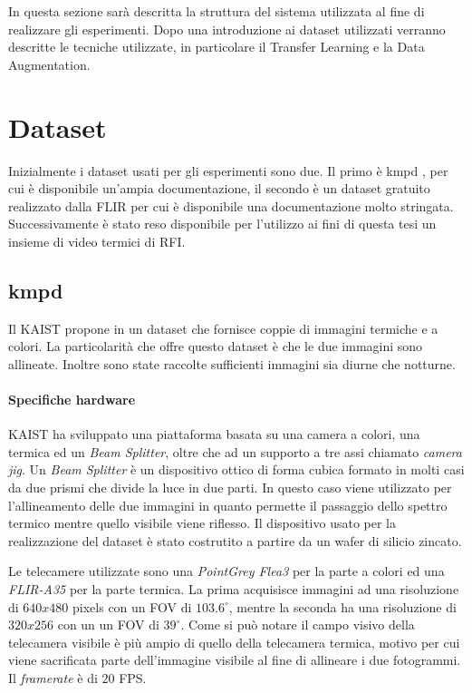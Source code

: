 \label{chap:sistema}
In questa sezione sarà descritta la struttura del sistema utilizzata al fine di realizzare gli esperimenti. Dopo una introduzione ai dataset utilizzati verranno descritte le tecniche utilizzate, in particolare il Transfer Learning e la Data Augmentation. 
\section{Dataset}
\label{sec:dataset}
Inizialmente i dataset usati per gli esperimenti sono due. Il primo è \ac{kmpd} \cite{DBLP:conf/cvpr/HwangPKCK15}, 
per cui è disponibile un'ampia documentazione, il secondo è un dataset gratuito realizzato dalla FLIR \cite{FLIRAdas} per cui è disponibile una documentazione molto stringata. Successivamente è stato reso disponibile per l'utilizzo ai fini di questa tesi un insieme di video termici di \ac{RFI}.
\subsection{\acl{kmpd}}
\label{subsec:kmpd}
Il \ac{KAIST} propone in \cite{DBLP:conf/cvpr/HwangPKCK15} un dataset che fornisce coppie di immagini termiche e a colori. La particolarità che offre questo dataset è che le due immagini sono allineate. Inoltre sono state raccolte sufficienti immagini sia diurne che notturne.
\paragraph{Specifiche hardware}
\ac{KAIST} ha sviluppato una piattaforma basata su una camera a colori, una termica ed un \textit{Beam Splitter}, oltre che ad un supporto a tre assi chiamato \textit{camera jig}. Un \textit{Beam Splitter} è un dispositivo ottico di forma cubica formato in molti casi da due prismi che divide la luce in due parti. In questo caso viene utilizzato per l'allineamento delle due immagini in quanto permette il passaggio dello spettro termico mentre quello visibile viene riflesso. Il dispositivo usato per la realizzazione del dataset è stato costrutito a partire da un wafer di silicio zincato.

Le telecamere utilizzate sono una \textit{PointGrey Flea3} per la parte a colori ed una \textit{FLIR-A35} per la parte termica. La prima acquisisce immagini ad una risoluzione di $640 x 480$ pixels con un \ac{FOV} di $103.6^\circ$, mentre la seconda ha una risoluzione di $320 x 256$ con un un \ac{FOV} di $39^\circ$. Come si può notare il campo visivo della telecamera visibile è più ampio di quello della telecamera termica, motivo per cui viene sacrificata parte dell'immagine visibile al fine di allineare i due fotogrammi. Il \textit{framerate} è di $20$ FPS.
